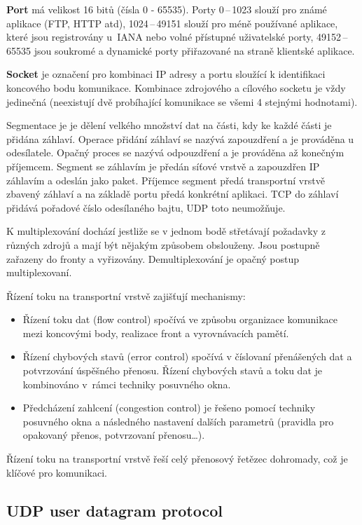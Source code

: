 \textbf{Port} má velikost 16 bitů (čísla 0 - 65535). Porty 0\,--\,1023 slouží pro známé aplikace (FTP, HTTP atd), 1024\,--\,49151 slouží pro méně používané aplikace, které jsou registrovány u~IANA nebo volné přístupné uživatelské porty, 49152\,--\,65535 jsou soukromé a dynamické porty přiřazované na straně klientské aplikace.

\textbf{Socket} je označení pro kombinaci IP adresy a portu sloužící k identifikaci koncového bodu komunikace. Kombinace zdrojového a cílového socketu je vždy jedinečná (neexistují dvě probíhající komunikace se všemi 4 stejnými hodnotami). 

Segmentace je je dělení velkého množství dat na části, kdy ke každé části je přidána záhlaví. Operace přidání záhlaví se nazývá zapouzdření a je prováděna u odesílatele. Opačný proces se nazývá odpouzdření a je prováděna až konečným příjemcem. Segment se záhlavím je předán síťové vrstvě a zapouzdřen IP záhlavím a odeslán jako paket. Příjemce segment předá transportní vrstvě zbavený záhlaví a na základě portu předá konkrétní aplikaci. TCP do záhlaví přidává pořadové číslo odesílaného bajtu, UDP toto neumožňuje. 

K multiplexování dochází jestliže se v jednom bodě střetávají požadavky z různých zdrojů a mají být nějakým způsobem obslouženy. Jsou postupně zařazeny do fronty a vyřizovány. Demultiplexování je opačný postup multiplexovaní. 

Řízení toku na transportní vrstvě zajišťují mechanismy:
\begin{itemize}[noitemsep]
    \item Řízení toku dat (flow control) spočívá ve způsobu organizace komunikace mezi koncovými body, realizace front a vyrovnávacích pamětí.
    \item Řízení chybových stavů (error control) spočívá v číslovaní  přenášených dat a potvrzování úspěšného přenosu. Řízení chybových stavů a toku dat je kombinováno v~rámci techniky posuvného okna.
    \item Předcházení zahlcení (congestion control) je řešeno pomocí techniky posuvného okna a následného nastavení dalších parametrů (pravidla pro opakovaný přenos, potvrzovaní přenosu\dots).
\end{itemize}

Řízení toku  na transportní vrstvě řeší celý přenosový řetězec dohromady, což je klíčové pro komunikaci.


\subsection{UDP user datagram protocol}

